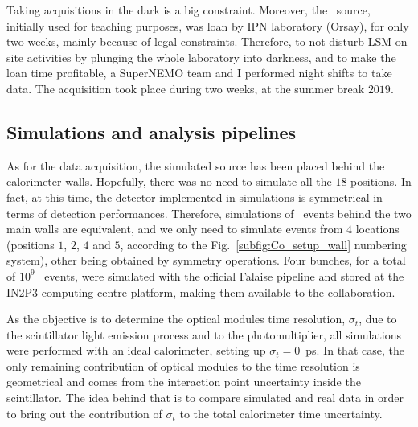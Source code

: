 Taking acquisitions in the dark is a big constraint.
Moreover, the \Co\ source, initially used for teaching purposes, was loan by IPN laboratory (Orsay), for only two weeks, mainly because of legal constraints.
Therefore, to not disturb LSM on-site activities by plunging the whole laboratory into darkness, and to make the loan time profitable, a SuperNEMO team and I performed night shifts to take data.
The acquisition took place during two weeks, at the summer break $2019$.

\subsection{Simulations and analysis pipelines}


As for the data acquisition, the simulated source has been placed behind the calorimeter walls.
Hopefully, there was no need to simulate all the $18$ positions.
In fact, at this time, the detector implemented in simulations is symmetrical in terms of detection performances.
Therefore, simulations of \Co\ events behind the two main walls are equivalent, and we only need to simulate events from $4$ locations (positions $1$, $2$, $4$ and $5$, according to the Fig.~\ref{subfig:Co_setup_wall} numbering system), other being obtained by symmetry operations.
Four bunches, for a total of $10^{9}$ \Co\ events, were simulated with the official Falaise pipeline and stored at the IN$2$P$3$ computing centre platform, making them available to the collaboration.

As the objective is to determine the optical modules time resolution, $\sigma_{t}$, due to the scintillator light emission process and to the photomultiplier, all simulations were performed with an ideal calorimeter, setting up ${\sigma_{t}=0}$~ps.
In that case, the only remaining contribution of optical modules to the time resolution is geometrical and comes from the interaction point uncertainty inside the scintillator.
The idea behind that is to compare simulated and real data in order to bring out the contribution of $\sigma_{t}$ to the total calorimeter time uncertainty.


